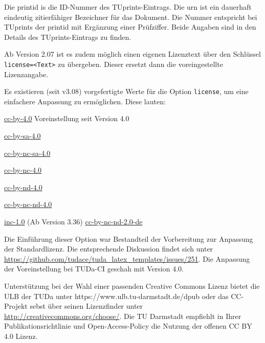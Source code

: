 \documentclass[
	ngerman,%
	accentcolor=9c,%
	ruledheaders=chapter,%
	class=book,%
	thesis={%
		type=dr,
		dr=rernat
	},
	fontsize=11pt,%
	parskip=half-,%
	custommargins=true,%
	marginpar=false,%
]{tudapub}
\begin{document}
\begin{description}
	      Die printid is die ID-Nummer des TUprints-Eintrags. Die urn ist ein dauerhaft eindeutig zitierfähiger Bezeichner für das Dokument. Die Nummer entspricht bei TUprints der printid mit Ergänzung einer Prüfziffer. Beide Angaben sind in den Details des TUprints-Eintrags zu finden.

	      Ab Version 2.07 ist es zudem möglich einen eigenen Lizenztext über den Schlüssel \verb|license=<Text>| zu übergeben. Dieser ersetzt dann die voreingestellte Lizenzangabe.

	      Es existieren (seit v3.08) vorgefertigte Werte für die Option \verb|license|, um eine einfachere Anpassung zu ermöglichen. Diese lauten:

	      \parbox[t]{.5\linewidth}{%
		      \ttfamily
		      \href{https://creativecommons.org/licenses/by/4.0/}{cc-by-4.0} \textnormal{Voreinstellung seit Version 4.0}\par
		      \href{https://creativecommons.org/licenses/by-sa/4.0/}{cc-by-sa-4.0}\par
		      \href{https://creativecommons.org/licenses/by-nc-sa/4.0/}{cc-by-nc-sa-4.0}\par
		      \href{https://creativecommons.org/licenses/by-nc-/4.0/}{cc-by-nc-4.0}\par
	      }%
	      \parbox[t]{.5\linewidth}{
		      \ttfamily
		      \href{https://creativecommons.org/licenses/by-nd/4.0/}{cc-by-nd-4.0}\par
		      \href{https://creativecommons.org/licenses/by-nc-nd/4.0/}{cc-by-nc-nd-4.0}\par
		      \href{https://rightsstatements.org/page/InC/1.0/}{inc-1.0}\textnormal{ (Ab Version 3.36)}
		      \href{https://creativecommons.org/licenses/by-nc-nd/2.0/}{cc-by-nc-nd-2.0-de}\par
	      }

	      Die Einführung dieser Option war Bestandteil der Vorbereitung zur Anpassung der Standardlizenz.
	      Die entsprechende Diskussion findet sich unter \url{https://github.com/tudace/tuda_latex_templates/issues/251}. Die Anpassung der Voreinstellung bei TUDa-CI geschah mit Version 4.0.

	      Unterstützung bei der Wahl einer passenden Creative Commons Lizenz bietet die ULB der TUDa unter https://www.ulb.tu-darmstadt.de/dpub  oder  das CC-Projekt sebst über seinen Lizenzfinder unter \url{http://creativecommons.org/choose/}.
	      Die TU Darmstadt empfiehlt in Ihrer Publikationsrichtlinie und Open-Access-Policy die Nutzung der offenen CC BY 4.0 Lizenz.


\end{description}
\end{document}
